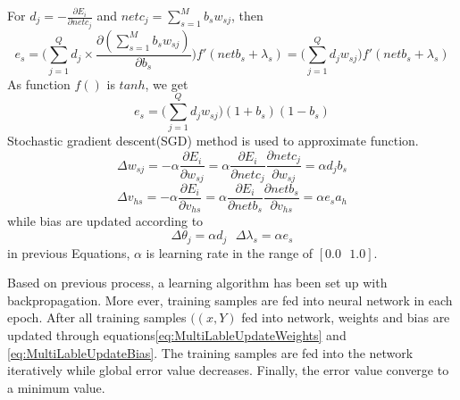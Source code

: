 For $d_{j} = - \frac{\partial E_{i}}{\partial netc_{j}}$ and $netc_{j} = \sum_{s=1}^M b_{s}w_{sj}$, then 
\begin{equation}\label{eq:MultiLableGenErrEs}
e_{s} = \big( \sum_{j=1}^Q d_{j} \times \frac{\partial (\sum_{s=1}^M b_{s}w_{sj})}{\partial b_{s}}\big) f'(netb_{s} + \lambda_{s}) = \big( \sum_{j=1}^Q d_{j}w_{sj}\big) f'(netb_{s} + \lambda_{s})
\end{equation}
As function $f()$ is $tanh$, we get
\begin{equation}\label{eq:MultiLableGenErrEsFin}
e_{s} = \big( \sum_{j=1}^Q d_{j}w_{sj}\big) (1+b_{s})(1-b_{s})
\end{equation}
Stochastic gradient descent(SGD) method is used to approximate function.
\begin{equation}\label{eq:MultiLableUpdateWeights}
\Delta w_{sj} = -\alpha \frac{\partial E_{i}}{\partial w_{sj}} = \alpha \frac{\partial E_{i}}{\partial netc_{j}} \frac{\partial netc_{j}}{\partial w_{sj}} = \alpha d_{j}b_{s}
\end{equation}
\begin{equation}\label{eq:MultiLableUpdateHidWeights}
\Delta v_{hs} = -\alpha \frac{\partial E_{i}}{\partial v_{hs}} = \alpha \frac{\partial E_{i}}{\partial netb_{s}} \frac{\partial netb_{s}}{\partial v_{hs}} = \alpha e_{s}a_{h}
\end{equation}
while bias are updated according to
\begin{equation}\label{eq:MultiLableUpdateBias}
\Delta \theta_{j} = \alpha d_{j} \text{ } \Delta \lambda_{s} = \alpha e_{s}
\end{equation}
in previous Equations, $\alpha$ is learning rate in the range of $[0.0 \text{ } 1.0]$.

Based on previous process, a learning algorithm has been set up with backpropagation. More ever, training samples are fed into neural network in each epoch. After all training samples $((x, Y)$ fed into network, weights and bias are updated through equations\ref{eq:MultiLableUpdateWeights} and \ref{eq:MultiLableUpdateBias}. The training samples are fed into the network iteratively while global error value decreases. Finally, the error value converge to a minimum value.

